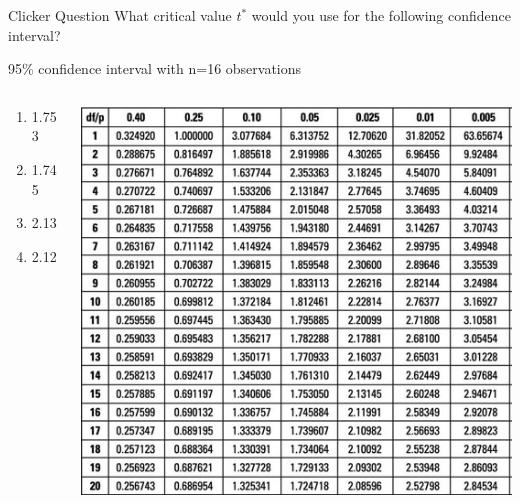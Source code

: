 \documentclass{beamer}
\begin{document}
\begin{frame}{Clicker Question}
	What critical value $t^*$ would you use for the following confidence interval?
	
	\begin{center}
		95\% confidence interval with n=16 observations
	\end{center}

	\begin{columns}
		\begin{column}{0.3\textwidth}
			\begin{enumerate}[label=(\alph*)]
				\item 1.753
				\item 1.745
				\item 2.13
				\item 2.12
			\end{enumerate}
		\end{column}

		\begin{column}{0.7\textwidth} 
			\begin{center}
			 	\includegraphics[width=\textwidth]{t_table3}
			\end{center}
		\end{column}
	\end{columns}
\end{frame}
\end{document}
